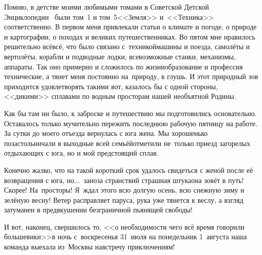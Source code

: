Помню, в детстве моими любимыми томами в Советской Детской Энциклопедии~\cite{ДетскаяЭнциклопедия} были том~1 и том~5\mdash <<Земля>> и~<<Техника>> соответственно. В первом меня привлекали статьи о климате и погоде, о природе и картографии, о походах и великих путешественниках. Во пятом мне нравилось решительно всё\mdash всё, что было связано с~техникой\mdash машины и поезда, самолёты и вертолёты, корабли и подводные лодки, всевозможные станки, механизмы, аппараты. Так оно примерно и сложилось по жизни\mdash образование и профессия технические, а тянет меня постоянно на~природу, в глушь. И этот природный зов приходится удовлетворять такими вот, казалось бы с одной стороны, <<дикими>> сплавами по водным просторам нашей необъятной Родины.

Как бы там ни было, к заброске и путешествию мы подготовились основательно. Оставалось только мучительно пережить последнюю рабочую пятницу на работе. За сутки до моего отъезда вернулась с юга жена. Мы хорошенько позастольничали в выходные всей семьёй\mdash отметили не~только приезд загорелых отдыхающих с юга, но и мой предстоящий сплав. 

Конечно жалко, что на такой короткий срок удалось свидеться с женой после её возвращения с юга, но$\ldots$~заноза странствий страшная штука\mdash она зовёт в путь! Скорее! На~просторы! Я~ждал этого всю долгую осень, всю снежную зиму и зелёную весну! Ветер расправляет паруса, рука уже тянется к веслу, а взгляд затуманен в предвкушении безграничной пьянящей свободы!

И вот, наконец, свершилось то, <<о необходимости чего всё время говорили большевики>>\cite{ЛенинПСС}\mdash в ночь с~воскресенья 31~июля на понедельник 1~августа наша команда выехала из~Москвы навстречу приключениям!

\begin{center}
\end{center}
